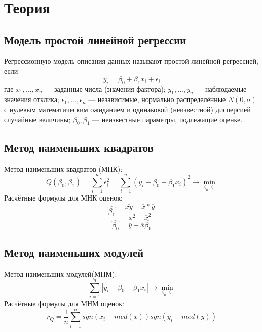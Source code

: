 \documentclass[12pt,a4paper]{article}
\begin{document}
	\section{Теория}
		\subsection{Модель простой линейной регрессии}
			Регрессионную модель описания данных называют простой линейной регрессией, если
			\begin{equation}
				y_i = \beta_0+\beta_1 x_i + \epsilon_i
			\end{equation} 
			где $x_1, ... , x_n$ — заданные числа (значения фактора); $y_1, ... , y_n$ — наблюдаемые значения отклика; $\epsilon_1, ... , \epsilon_n$ — независимые, нормально распределённые $N(0, \sigma)$ с нулевым математическим ожиданием и одинаковой (неизвестной) дисперсией случайные величины; $\beta_0, \beta_1$ —
			неизвестные параметры, подлежащие оценке.
		\subsection{Метод наименьших квадратов}
			Метод наименьших квадратов (МНК):
			\begin{equation}
				Q(\beta_0,\beta_1)=\sum_{i=1}^{n}\epsilon_i^2=\sum_{i=1}^{n}(y_i-\beta_0-\beta_1 x_i)^2 \rightarrow \underset{\beta_0, \beta_1}\min	
			\end{equation}
			Расчётные формулы для МНК оценок:
			\begin{equation}
				\hat{\beta_1}=\frac{\overline{xy}-{\overline{x}}* {\overline{y}}}{\overline{x^2}-{\overline{x}}^2}
			\end{equation}
			\begin{equation}
				\hat{\beta_0}=\overline{y}-\overline{x}\hat{\beta_1}
			\end{equation}
		\subsection{Метод наименьших модулей}
			Метод наименьших модулей(МНМ):
			\begin{equation}
				\sum_{i=1}^{n}|y_i-\beta_0-\beta_1 x_i|\rightarrow\underset{\beta_0, \beta_1}\min	
			\end{equation}
			Расчётные формулы для МНМ оценок:
			\begin{equation}
				r_Q=\frac{1}{n}\sum_{i=1}^{n}sgn(x_i-med(x))sgn(y_i-med(y))
			\end{equation}
			
\end{document}
